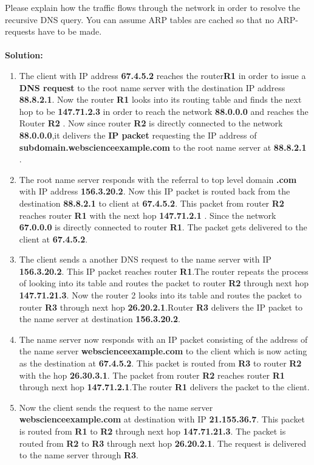 \documentclass{resources/WeSTassignment}
\begin{document}
Please explain how the traffic flows through the network in order to resolve the recursive DNS query. You can assume ARP tables are cached so that no ARP-requests have to be made. \\ \\ \textbf{Solution:}
\begin{enumerate}
\item The client with IP address \textbf{67.4.5.2} reaches the router\textbf{R1} in order to issue a \textbf{DNS request} to the root name server with the destination IP address \textbf{88.8.2.1}. Now the router \textbf{R1} looks into its routing table and finds the next hop to be \textbf{147.71.2.3} in order to reach the network \textbf{88.0.0.0} and reaches the Router \textbf{R2} . Now since router \textbf{R2} is directly connected to the network \textbf{88.0.0.0},it delivers the \textbf{IP packet} requesting the IP address of \textbf{subdomain.webscienceexample.com} to the root name server at   \textbf{88.8.2.1} .
\item The root name server responds with the referral to top level domain \textbf{.com} with IP address \textbf{156.3.20.2}. Now this IP packet is routed back from the destination \textbf{88.8.2.1} to client at \textbf{67.4.5.2}. This packet from router \textbf{R2} reaches router \textbf{R1} with the next hop \textbf{147.71.2.1} . Since the network \textbf{67.0.0.0} is directly connected to router \textbf{R1}. The packet gets delivered to the client at \textbf{67.4.5.2}.
\item The client sends a another DNS request to the name server with IP \textbf{156.3.20.2}. This IP packet reaches router \textbf{R1}.The router repeats the process of looking into its table and routes the packet to router \textbf{R2} through next hop \textbf{147.71.21.3}. Now the router 2 looks into its table and routes the packet to router \textbf{R3} through next hop \textbf{26.20.2.1}.Router \textbf{R3} delivers the IP packet to the name server at destination \textbf{156.3.20.2}. 
\item The name server now responds with an IP packet consisting of the address of the name server \textbf{webscienceexample.com} to the client which is now acting as the destination at \textbf{67.4.5.2}. This packet is routed from \textbf{R3} to router \textbf{R2} with the hop \textbf{26.30.3.1}. The packet from router \textbf{R2} reaches router \textbf{R1} through next hop \textbf{147.71.2.1}.The router \textbf{R1} delivers the packet to the client.
\item Now the client sends the request to the name server \textbf{webscienceexample.com} at destination with IP \textbf{21.155.36.7}. This packet is routed from \textbf{R1} to \textbf{R2} through next hop \textbf{147.71.21.3}. The packet is routed from \textbf{R2} to \textbf{R3} through next hop \textbf{26.20.2.1}. The request is delivered to the name server through \textbf{R3}.

\end{enumerate}
\end{document}
